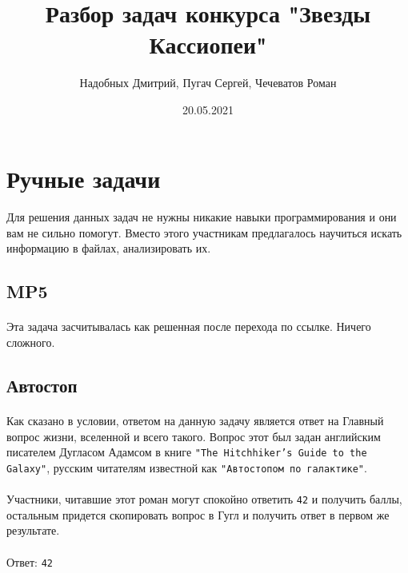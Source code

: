 \documentclass[12pt]{article}
\title{Разбор задач конкурса "Звезды Кассиопеи"}
\date{20.05.2021}
\author{Надобных Дмитрий, Пугач Сергей, Чечеватов Роман}
\begin{document}
    \maketitle
    \newpage
    \raggedright


    \section{Ручные задачи}

    \paragraph{}
    Для решения данных задач не нужны никакие навыки программирования и они вам не сильно помогут.
    Вместо этого участникам предлагалось научиться искать информацию в файлах, анализировать их.
    \newpage

    \subsection{MP5}

    \paragraph{}
    Эта задача засчитывалась как решенная после перехода по ссылке.
    Ничего сложного.


    \subsection{Автостоп}
    \paragraph{}
    Как сказано в условии, ответом на данную задачу является ответ на Главный вопрос жизни, вселенной и всего такого.
    Вопрос этот был задан английским писателем Дугласом Адамсом в книге \verb|"The Hitchhiker’s Guide to the Galaxy"|,
    русским читателям известной как \verb|"Автостопом по галактике"|.
    \paragraph{}
    Участники, читавшие этот роман могут спокойно ответить \verb|42| и получить баллы,
    остальным придется скопировать вопрос в Гугл и получить ответ в первом же результате.
    \paragraph{}
    Ответ: \verb|42|
\end{document}
